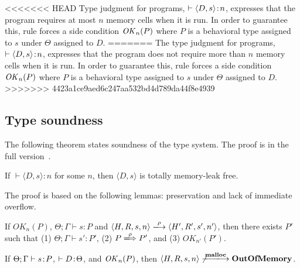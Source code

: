 <<<<<<< HEAD
Type judgment for programs, \(\vdash \langle D, s \rangle \!:\! n\),
expresses that the program requires at most \(n\) memory cells when it
is run.  In order to guarantee this, rule  forces a side
condition \(\mathit{OK}_n(P)\) where \(P\) is a behavioral type assigned to
\(s\) under \(\Theta\) assigned to \(D\).
=======
The type judgment for programs, \(\vdash \langle D, s \rangle \!:\! n\),
expresses that the program does not require more than \(n\) memory
cells when it is run.  In order to guarantee this, rule 
forces a side condition \(\mathit{OK}_n(P)\) where \(P\) is a behavioral type
assigned to \(s\) under \(\Theta\) assigned to \(D\).
>>>>>>> 4423a1ce9aed6c247aa532bd4d789da44f8e4939

\subsection{Type soundness}


The following theorem states soundness of the type system.  The proof
is in the full version~\cite{fullversion}.

\begin{theorem}\label{thm1}
If $\vdash \langle D, s \rangle : n$ for some \(n\), then \(\langle D,
s \rangle\) is totally memory-leak free.
\end{theorem}


The proof is based on the following lemmas: preservation and lack of
immediate overflow.

\begin{lemma}[Preservation]
\label{lem:preservation}
If $OK_{n}(P)$, $\Theta; \Gamma \vdash s : P$ and $\langle H,R,s,n
\rangle \xlongrightarrow{\rho} \langle H',R',s', n' \rangle$, then
there exists $P'$ such that (1) $ \Theta; \Gamma \vdash s' : P'$, (2)
\(P \xLongrightarrow{\rho} P'\), and (3) \(OK_{n'}(P')\).
\end{lemma}


\begin{lemma}
\label{lem:immediateSafety}
If $\Theta; \Gamma \vdash s \!:\! P$, \(\vdash D \!:\! \Theta\), and
\(\mathit{OK}_n(P)\), then $\langle H, R, s, n \rangle
\not\xlongrightarrow{\Malloc} \OVERFLOW$.
\end{lemma}
